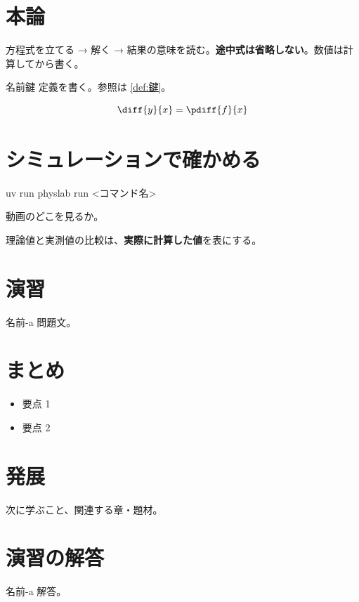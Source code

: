 \section{本論}\label{sec:名前-main}

方程式を立てる → 解く → 結果の意味を読む。\textbf{途中式は省略しない}。数値は計算してから書く。

\begin{defn}{名前}{鍵}
定義を書く。参照は \ref{def:鍵}。
\end{defn}

\begin{equation}
  \diff{y}{x}=\pdiff{f}{x}\label{eq:名前-a}
\end{equation}

\section{シミュレーションで確かめる}\label{sec:名前-sim}

\begin{simbox}
\begin{terminal}
uv run physlab run <コマンド名>
\end{terminal}
動画のどこを見るか。
\end{simbox}


理論値と実測値の比較は、\textbf{実際に計算した値}を表にする。

\section{演習}\label{sec:名前-exercises}

\begin{exercise}[基礎]{名前-a}
問題文。
\end{exercise}

\section{まとめ}\label{sec:名前-summary}

\begin{summary}
\begin{itemize}
  \item 要点 1
  \item 要点 2
\end{itemize}
\end{summary}

\section{発展}\label{sec:名前-advanced}

次に学ぶこと、関連する章・題材。

\section{演習の解答}\label{sec:名前-solutions}

\begin{solution}{名前-a}
解答。
\end{solution}
